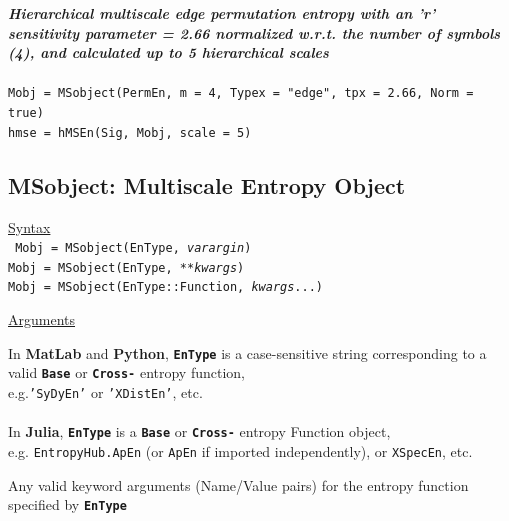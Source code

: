 \documentclass[12pt, a4paper, titlepage, openany]{book}
\begin{document}
\noindent \emph{\textbf{Hierarchical multiscale edge permutation entropy with an 'r' sensitivity parameter = 2.66 normalized w.r.t. the number of symbols (4), and calculated up to 5 hierarchical scales}}
\\ \ \\ \indent \texttt{Mobj = MSobject(PermEn, m = 4, Typex = "edge", tpx = 2.66, Norm = true)\\
\indent hmse = hMSEn(Sig, Mobj, scale = 5)}
\normalsize



\newpage
\subsection{\normalsize MSobject: \hspace{15mm} Multiscale Entropy Object} \label{Mobjx}
\noindent\ul{Syntax} \vspace{6mm} \\ \noindent \texttt{\footnotesize
Mobj = MSobject(EnType, \textit{varargin})\\
Mobj = MSobject(EnType, \textit{**kwargs})\\ 
Mobj = MSobject(EnType::Function, \textit{kwargs}...)}

\noindent \ul{Arguments}
\begin{description}[labelsep=2cm, labelwidth=5cm, nosep, style=multiline,leftmargin=4cm]\footnotesize
\item[\texttt{EnType}]		In \textbf{MatLab} and \textbf{Python}, \texttt{\textbf{EnType}} is a case-sensitive 							string corresponding to a valid \texttt{\textbf{Base}} or  \texttt{\textbf{Cross-}} entropy 							function, \\	e.g.\texttt{'SyDyEn'} or \texttt{'XDistEn'}, etc.\\ \ \\
							In \textbf{Julia}, \texttt{\textbf{EnType}} is a \texttt{\textbf{Base}} or  									\texttt{\textbf{Cross-}} entropy Function object,\\ e.g. \texttt{EntropyHub.ApEn} (or 									\texttt{ApEn} if imported independently), or \texttt{XSpecEn}, etc.\\
\item[\texttt{varargin\\ **kwargs\\kwargs...}] 		Any valid keyword arguments (Name/Value pairs) for the entropy function specified by \texttt{\textbf{EnType}}\\
\end{description}
\end{document}

